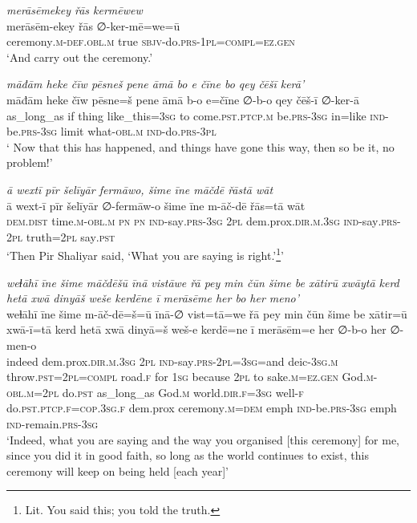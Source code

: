 \ea \label{ZP.123}
\textit{merāsēmekey řās kermēwew} \\ 
\gll merāsēm-ekey řās ∅-ker-mē=we=ū \\ 
 ceremony\textsc{.m}\textsc{-def}\textsc{.obl}\textsc{.m} true \textsc{sbjv-}do\textsc{.prs}\textsc{-1pl}\textsc{=compl}\textsc{\textsc{=ez.gen}} \\ 
\glt `And carry out the ceremony.'
\z 
 
\ea \label{ZP.125}
\textit{māđām heke čīw pēsneš pene āmā bo e čīne bo qey čēšī kerā’} \\ 
\gll māđām heke čīw pēsne=š pene āmā b-o e=čīne ∅-b-o qey čēš-ī ∅-ker-ā \\ 
 as\_long\_as if thing like\_this\textsc{=3sg} to come\textsc{.pst}\textsc{.ptcp}\textsc{.m} be\textsc{.prs}\textsc{-3sg} in=like \textsc{ind-}be\textsc{.prs}\textsc{-3sg} limit what\textsc{-obl}\textsc{.m} \textsc{ind-}do\textsc{.prs}\textsc{-3pl} \\ 
\glt ` Now that this has happened, and things have gone this way, then so be it, no problem!'
\z 
 
\ea \label{ZP.126}
\textit{ā wextī pīr šelīyār fermāwo, šime īne māčdē řāstā wāt} \\ 
\gll ā wext-ī pīr šelīyār ∅-fermāw-o šime īne m-āč-dē řās=tā wāt \\ 
 \textsc{dem.dist} time\textsc{.m}\textsc{-obl}\textsc{.m} \textsc{pn} \textsc{pn} \textsc{ind-}say\textsc{.prs}\textsc{-3sg} \textsc{2pl} dem.prox\textsc{.dir}\textsc{.m}\textsc{.3sg} \textsc{ind-}say\textsc{.prs}-\textsc{2pl} truth=\textsc{2pl} say\textsc{.pst} \\ 
\glt `Then Pir Shaliyar said, ‘What you are saying is right.’\footnote{Lit. You said this; you told the truth.}'
\z 
 
\ea \label{ZP.128}
\textit{weɫāhī īne šime māčdēšū īnā vistāwe řā pey min čūn šime be xātirū xwāytā kerd hetā xwā dinyāš weše kerdēne ī merāsēme her bo her meno’} \\ 
\gll weɫāhī īne šime m-āč-dē=š=ū īnā-∅ vist=tā=we řā pey min čūn šime be xātir=ū xwā-ī=tā kerd hetā xwā dinyā=š weš-e kerdē=ne ī merāsēm=e her ∅-b-o her ∅-men-o \\ 
 indeed dem.prox\textsc{.dir}\textsc{.m}\textsc{.3sg} \textsc{2pl} \textsc{ind-}say\textsc{.prs}-\textsc{2pl}\textsc{=3sg}=and deic\textsc{-3sg}\textsc{.m} throw\textsc{.pst}=\textsc{2pl}\textsc{=compl} road\textsc{.f} for \textsc{1sg} because \textsc{2pl} to sake\textsc{.m}\textsc{\textsc{=ez.gen}} God\textsc{.m}\textsc{-obl}\textsc{.m}=\textsc{2pl} do\textsc{.pst} as\_long\_as God\textsc{.m} world\textsc{.dir}\textsc{.f}\textsc{=3sg} well\textsc{-f} do\textsc{.pst}\textsc{.ptcp}\textsc{.f}\textsc{=cop}\textsc{.3sg}\textsc{.f} dem.prox ceremony\textsc{.m}\textsc{=dem} emph \textsc{ind-}be\textsc{.prs}\textsc{-3sg} emph \textsc{ind-}remain\textsc{.prs}\textsc{-3sg} \\ 
\glt `Indeed, what you are saying and the way you organised [this ceremony] for me, since you did it in good faith, so long as the world continues to exist, this ceremony will keep on being held [each year]'
\z 
 
